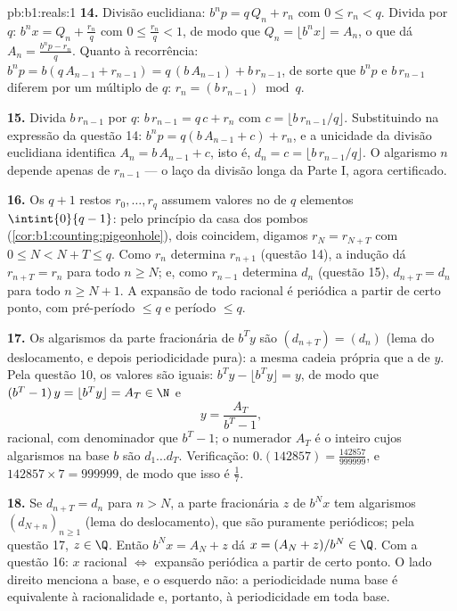 \begin{solution}{pb:b1:reals:1}
\textbf{14.} Divisão euclidiana: $b^n p = q\,Q_n + r_n$ com $0
\leq r_n < q$. Divida por $q$: $b^n x = Q_n + \frac{r_n}{q}$ com
$0 \leq \frac{r_n}{q} < 1$, de modo que $Q_n = \lfloor b^n x \rfloor =
A_n$, o que dá $A_n = \frac{b^n p - r_n}{q}$. Quanto à recorrência:
$b^n p = b(q\,A_{n-1} + r_{n-1}) = q\,(b\,A_{n-1}) +
b\,r_{n-1}$, de sorte que $b^n p$ e $b\,r_{n-1}$ diferem por um múltiplo de
$q$: $r_n = (b\,r_{n-1}) \bmod q$.

\textbf{15.} Divida $b\,r_{n-1}$ por $q$: $b\,r_{n-1} = q\,c +
r_n$ com $c = \lfloor b\,r_{n-1}/q \rfloor$. Substituindo na
expressão da questão 14: $b^n p = q(b\,A_{n-1} + c) + r_n$,
e a unicidade da divisão euclidiana identifica $A_n = b\,A_{n-1}
+ c$, isto é, $d_n = c = \lfloor b\,r_{n-1}/q \rfloor$. O algarismo
$n$ depende apenas de $r_{n-1}$ --- o laço da divisão longa da Parte
I, agora certificado.

\textbf{16.} Os $q + 1$ restos $r_0, \dots, r_q$ assumem valores
no  de $q$ elementos $\intint{0}{q-1}$: pelo princípio da casa dos
pombos (\cref{cor:b1:counting:pigeonhole}), dois coincidem, digamos
$r_N = r_{N+T}$ com $0 \leq N < N + T \leq q$. Como $r_n$
determina $r_{n+1}$ (questão 14), a indução dá $r_{n+T} =
r_n$
para todo $n \geq N$; e, como $r_{n-1}$ determina $d_n$
(questão 15), $d_{n+T} = d_n$ para todo $n \geq N + 1$. A expansão
de todo racional é periódica a partir de certo ponto, com pré-período
$\leq q$ e período $\leq q$.

\textbf{17.} Os algarismos da parte fracionária de $b^T y$ são
$(d_{n+T}) = (d_n)$ (lema do deslocamento, e depois periodicidade pura): a
mesma cadeia própria que a de $y$. Pela questão 10, os valores são
iguais: $b^T y - \lfloor b^T y \rfloor = y$, de modo que $(b^T - 1)\,y = \lfloor
b^T y \rfloor = A_T \in \N$ e
\[
y = \frac{A_T}{b^T - 1} ,
\]
racional, com denominador que  $b^T - 1$; o numerador $A_T$
é o inteiro cujos algarismos na base $b$ são $d_1 \dots d_T$. Verificação:
$0.(142857) = \frac{142857}{999999}$, e $142857 \times 7 =
999999$, de modo que isso é $\frac 17$.

\textbf{18.} Se $d_{n+T} = d_n$ para $n > N$, a parte fracionária
$z$ de $b^N x$ tem algarismos $(d_{N+n})_{n\geq1}$ (lema do deslocamento),
que são puramente periódicos; pela questão 17, $z \in \Q$. Então $b^N
x = A_N + z$ dá $x = (A_N + z)/b^N \in \Q$. Com a questão 16:
$x$ racional $\iff$ expansão periódica a partir de certo ponto. O lado
direito menciona a base, e o esquerdo não: a periodicidade numa base é
equivalente à racionalidade e, portanto, à periodicidade em toda base.


\end{solution}
